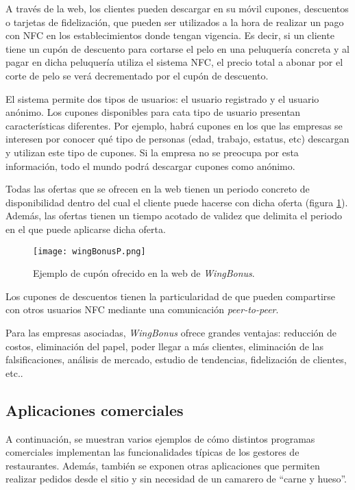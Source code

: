   A través de la web, los clientes pueden descargar en su móvil cupones, 
  descuentos o tarjetas de fidelización, que pueden ser utilizados a la hora 
  de realizar un pago con \acs{NFC} en los establecimientos donde tengan 
  vigencia. Es decir, si un cliente tiene un cupón de descuento para cortarse 
  el pelo en una peluquería concreta y al pagar en dicha peluquería utiliza el 
  sistema \acs{NFC}, el precio total a abonar por el corte de pelo se verá 
  decrementado por el cupón de descuento.

  El sistema permite dos tipos de usuarios: el usuario registrado y el usuario
  anónimo. Los cupones disponibles para cata tipo de usuario presentan
  características diferentes. Por ejemplo, habrá cupones en los que las
  empresas se interesen por conocer qué tipo de personas (edad, trabajo,
  estatus, etc) descargan y utilizan este tipo de cupones. Si la empresa no
  se preocupa por esta información, todo el mundo podrá descargar cupones
  como anónimo.

  Todas las ofertas que se ofrecen en la web tienen un periodo concreto de
  disponibilidad dentro del cual el cliente puede hacerse con dicha oferta
  (figura \ref{fig:wingBonusP}). Además, las ofertas tienen un tiempo acotado
  de validez que delimita el periodo en el que puede aplicarse dicha oferta.

  \begin{figure}[!h]
    \begin{center}
      \texttt{[image: wingBonusP.png]}
      \caption{Ejemplo de cupón ofrecido en la web de \emph{WingBonus}.}
      \label{fig:wingBonusP}
    \end{center}
  \end{figure}

  Los cupones de descuentos tienen la particularidad de que pueden compartirse
  con otros usuarios \acs{NFC} mediante una comunicación \emph{peer-to-peer}.

  Para las empresas asociadas, \emph{WingBonus} ofrece grandes ventajas: 
  reducción de costos, eliminación del papel, poder llegar a más clientes,
  eliminación de las falsificaciones, análisis de mercado, estudio de
  tendencias, fidelización de clientes, etc.\cite{bib:wingBonus}.

  \subsection{Aplicaciones comerciales}
  A continuación, se muestran varios ejemplos de cómo distintos programas
  comerciales implementan las funcionalidades típicas de los gestores de
  restaurantes. Además, también se exponen otras aplicaciones que permiten
  realizar pedidos desde el sitio y sin necesidad de un camarero de ``carne y
  hueso''.

